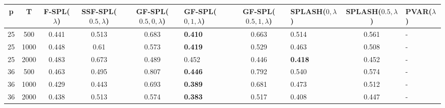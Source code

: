\begin{tabular}{ccccclclcl}
\hline
  p  &  T   &  F-SPL($\lambda$)  &  SSF-SPL($0.5, \lambda$)  &  GF-SPL($0.5, 0, \lambda$)  & GF-SPL($0, 1, \lambda$)   &  GF-SPL($0.5, 1, \lambda$)  & SPLASH($0, \lambda$)   &  SPLASH($0.5, \lambda$)  & PVAR($\lambda$)   \\
\hline
 25  & 500  &       0.441        &           0.513           &            0.683            & \textbf{0.410}            &            0.663            & 0.514                  &          0.561           & -                 \\
 25  & 1000 &       0.448        &           0.61            &            0.573            & \textbf{0.419}            &            0.529            & 0.463                  &          0.508           & -                 \\
 25  & 2000 &       0.483        &           0.673           &            0.489            & 0.452                     &            0.446            & \textbf{0.418}         &          0.452           & -                 \\
 36  & 500  &       0.463        &           0.495           &            0.807            & \textbf{0.446}            &            0.792            & 0.540                  &          0.574           & -                 \\
 36  & 1000 &       0.429        &           0.443           &            0.693            & \textbf{0.389}            &            0.681            & 0.473                  &          0.512           & -                 \\
 36  & 2000 &       0.438        &           0.513           &            0.574            & \textbf{0.383}            &            0.517            & 0.408                  &          0.447           & -                 \\
\hline
\end{tabular}